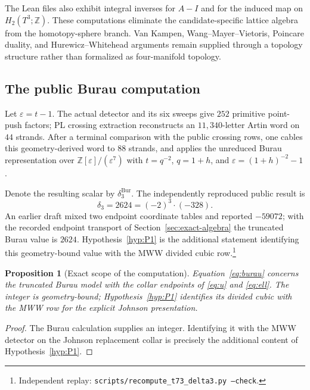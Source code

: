 \documentclass[11pt]{amsart}
\newtheorem{proposition}[theorem]{Proposition}
\theoremstyle{definition}
\theoremstyle{remark}
\newcommand{\Z}{\mathbb{Z}}
\newcommand{\Bur}{\mathrm{Bur}}
\begin{document}
The Lean files also exhibit integral inverses for $A-I$ and for the induced
map on $H_2(T^3;\Z)$.  These computations eliminate the candidate-specific
lattice algebra from the homotopy-sphere branch.  Van Kampen,
Wang--Mayer--Vietoris, Poincare duality, and Hurewicz--Whitehead arguments
remain supplied through a topology structure rather than formalized as
four-manifold topology.

\subsection{The public Burau computation}

Let $\varepsilon=t-1$.  The actual detector and its six sweeps give $252$
primitive point-push factors; PL crossing extraction reconstructs an
$11{,}340$-letter Artin word on $44$ strands.  After a terminal comparison
with the public crossing rows, one cables this geometry-derived word to $88$ strands,
and applies the unreduced Burau representation over
$\Z[\varepsilon]/(\varepsilon^7)$ with $t=q^{-2}$, $q=1+h$, and
$\varepsilon=(1+h)^{-2}-1$.

Denote the resulting scalar by $\delta_3^{\Bur}$.  The independently
reproduced public result is
\begin{equation}\label{eq:burau}
\delta_3=2624=(-2)^3\cdot(-328).
\end{equation}
An earlier draft mixed two endpoint coordinate tables and reported
$-59072$; with the recorded endpoint transport of Section~\ref{sec:exact-algebra}
the truncated Burau value is $2624$.  Hypothesis~\ref{hyp:P1} is the additional
statement identifying this geometry-bound value with the MWW divided cubic row.\footnote{Independent replay:
\texttt{scripts/recompute\_t73\_delta3.py --check}.}

\begin{proposition}[Exact scope of the computation]\label{prop:scope}
Equation~\eqref{eq:burau} concerns the truncated Burau model with the collar
endpoints of \eqref{eq:u} and \eqref{eq:ell}.  The integer is geometry-bound;
Hypothesis~\ref{hyp:P1} identifies its divided cubic with the MWW row for the
explicit Johnson presentation.
\end{proposition}

\begin{proof}
The Burau calculation supplies an integer.  Identifying it with the MWW
detector on the Johnson replacement collar is precisely the additional
content of Hypothesis~\ref{hyp:P1}.
\end{proof}
\end{document}

